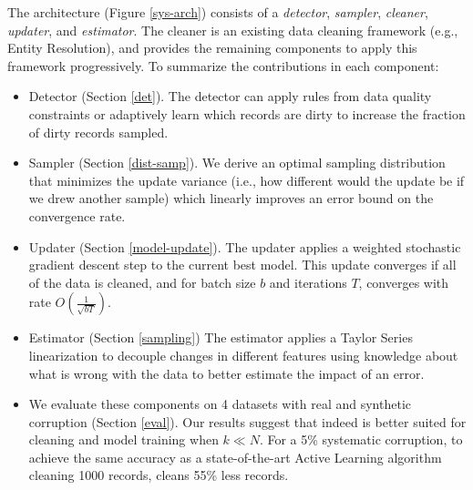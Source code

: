 The \sys architecture (Figure \ref{sys-arch}) consists of a \emph{detector}, \emph{sampler}, \emph{cleaner}, \emph{updater}, and \emph{estimator}.
The cleaner is an existing data cleaning framework (e.g., Entity Resolution), and \sys provides the remaining components to apply this framework progressively.
To summarize the contributions in each component:
\begin{itemize}[noitemsep]
\item Detector (Section \ref{det}). The detector can apply rules from data quality constraints or adaptively learn which records are dirty to increase the fraction of dirty records sampled.
\item Sampler (Section \ref{dist-samp}). We derive an optimal sampling distribution that minimizes the update variance (i.e., how different would the update be if we drew another sample) which linearly improves an error bound on the convergence rate.
\item Updater (Section \ref{model-update}). The updater applies a weighted stochastic gradient descent step to the current best model. This update converges if all of the data is cleaned, and for batch size $b$ and iterations $T$, converges with rate $O(\frac{1}{\sqrt{bT}})$. 
\item Estimator (Section \ref{sampling}) The estimator applies a Taylor Series linearization to decouple changes in different features using knowledge about what is wrong with the data to better estimate the impact of an error.
\item We evaluate these components on 4 datasets with real and synthetic corruption (Section \ref{eval}). Our results suggest that indeed \sys is better suited for cleaning and model training when $k\ll N$. For a 5\%  systematic corruption, to achieve the same accuracy as a state-of-the-art Active Learning algorithm cleaning 1000 records, \sys cleans 55\% less records.
\end{itemize}






